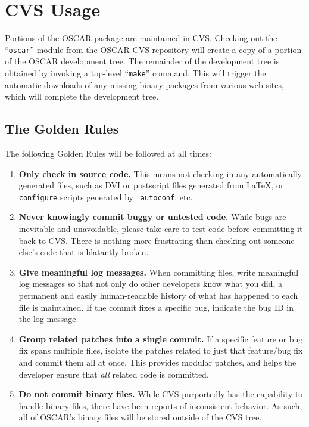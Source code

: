 %
%
%

\section{CVS Usage}
\label{sec:cvs}

Portions of the OSCAR package are maintained in CVS.  Checking out the
``{\tt oscar}'' module from the OSCAR CVS repository will create a
copy of a portion of the OSCAR development tree.  The remainder of the
development tree is obtained by invoking a top-level ``{\tt make}''
command.  This will trigger the automatic downloads of any missing
binary packages from various web sites, which will complete the
development tree.


\subsection{The Golden Rules}

The following Golden Rules will be followed at all times:

\begin{enumerate}
\item {\bf Only check in source code.}  This means not checking in any
  automatically-generated files, such as DVI or postscript files
  generated from \LaTeX, or {\tt configure} scripts generated by {\tt
    autoconf}, etc.
  
\item {\bf Never knowingly commit buggy or untested code.}  While bugs
  are inevitable and unavoidable, please take care to test code before
  committing it back to CVS.  There is nothing more frustrating than
  checking out someone else's code that is blatantly broken.
  
\item {\bf Give meaningful log messages.}  When committing files,
  write meaningful log messages so that not only do other developers
  know what you did, a permanent and easily human-readable history of
  what has happened to each file is maintained.  If the commit fixes a
  specific bug, indicate the bug ID in the log message.
  
\item {\bf Group related patches into a single commit.}  If a specific
  feature or bug fix spans multiple files, isolate the patches related
  to just that feature/bug fix and commit them all at once.  This
  provides modular patches, and helps the developer ensure that {\em
    all} related code is committed.

\item {\bf Do not commit binary files.}  While CVS purportedly has the
  capability to handle binary files, there have been reports of
  inconsistent behavior.  As such, all of OSCAR's binary files will be
  stored outside of the CVS tree.
\end{enumerate}

